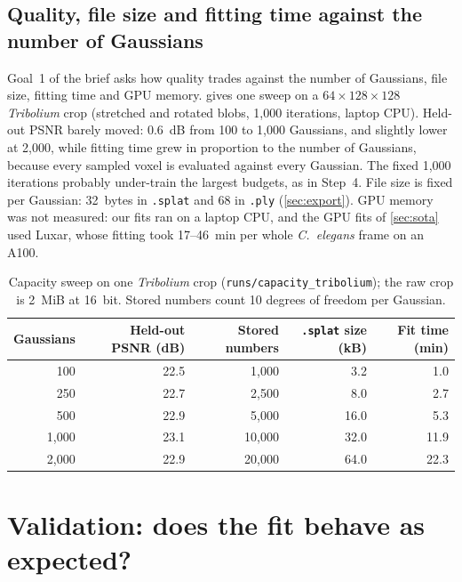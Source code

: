 \documentclass[
  paper=a4,
  fontsize=11pt,
  english,
  numbers=noenddot,
  parskip=half,
  cdgeometry=symmetric,
  cd=barcolor,
  cdfont=false
]{tudscrartcl}
\begin{document}
\subsection{Quality, file size and fitting time against the number of Gaussians}\label{sec:cost}

Goal~1 of the brief asks how quality trades against the number of Gaussians, file size,
fitting time and GPU memory.  gives one sweep on a $64\times128\times128$
\emph{Tribolium} crop (stretched and rotated blobs, 1{,}000 iterations, laptop CPU). Held-out
PSNR barely moved: \SI{0.6}{dB} from 100 to 1{,}000 Gaussians, and slightly lower at 2{,}000,
while fitting time grew in proportion to the number of Gaussians, because every sampled voxel
is evaluated against every Gaussian. The fixed 1{,}000 iterations probably under-train the
largest budgets, as in Step~4. File size is fixed per Gaussian: 32~bytes in \texttt{.splat}
and 68 in \texttt{.ply} (\cref{sec:export}). GPU memory was not measured: our fits ran on a
laptop CPU, and the GPU fits of \cref{sec:sota} used Luxar, whose fitting took 17--46~min per
whole \emph{C.~elegans} frame on an A100.

\begin{table}[tb]
  \centering\small
  \begin{tabular}{@{}rrrrr@{}}
    \toprule
    Gaussians & Held-out PSNR (dB) & Stored numbers & \texttt{.splat} size (kB) & Fit time (min) \\
    \midrule
    100 & 22.5 & 1{,}000 & 3.2 & 1.0 \\
    250 & 22.7 & 2{,}500 & 8.0 & 2.7 \\
    500 & 22.9 & 5{,}000 & 16.0 & 5.3 \\
    1{,}000 & 23.1 & 10{,}000 & 32.0 & 11.9 \\
    2{,}000 & 22.9 & 20{,}000 & 64.0 & 22.3 \\
    \bottomrule
  \end{tabular}
  \caption{Capacity sweep on one \emph{Tribolium} crop (\texttt{runs/capacity\_tribolium}); the raw
  crop is \SI{2}{MiB} at 16~bit. Stored numbers count 10 degrees of freedom per Gaussian.}
  \label{tab:cost}
\end{table}

\section{Validation: does the fit behave as expected?}\label{sec:validation}
\end{document}

